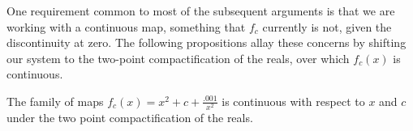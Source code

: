 

			One requirement common to most of the subsequent arguments is that we are working with a continuous map, something that $f_c$ currently is not, given the discontinuity at zero. The following propositions allay these concerns by shifting our system to the two-point compactification of the reals, over which $f_c (x)$ is continuous. 

			\begin{myprop}\label{contin}
				The family of maps $f_c (x) = x^2 + c + \frac{.001}{x^2}$ is continuous with respect to $x$ and $c$ under the two point compactification of the reals.
			\end{myprop}

